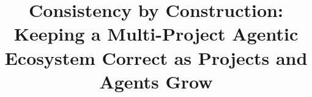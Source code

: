 \documentclass[10pt,conference]{IEEEtran}
\newif\ifanon
\begin{document}
\title{Consistency by Construction: Keeping a Multi-Project Agentic Ecosystem Correct as Projects and Agents Grow}
\ifanon
\author{\IEEEauthorblockN{Anonymous Author(s)}\IEEEauthorblockA{Affiliation withheld for double-anonymous review}}
\else
\author{}
\fi
\maketitle












\end{document}
